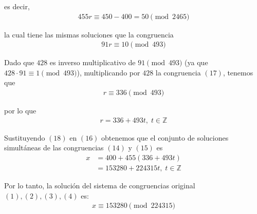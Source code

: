 \documentclass[letterpaper,10pt]{article}
\begin{document}
\begin{enumerate}
\begin{itemize}
        es decir,
        \begin{align*}
            455r \equiv 450-400 = 50 \pmod{2465}
        \end{align*}
        
        la cual tiene las mismas soluciones que la congruencia 
        \begin{align}
            91r \equiv 10 \pmod{493}
        \end{align}
        
        Dado que $428$ es inverso multiplicativo de $91 \pmod{493}$ (ya que
        $428 \cdot 91 \equiv 1 \pmod{493}$), multiplicando por $428$ la 
        congruencia $(17)$, tenemos que 
        \begin{align*}
            r \equiv 336 \pmod{493}
        \end{align*}
        
        por lo que 
        \begin{align}
            r = 336 + 493t, \; t \in \mathbb{Z}
        \end{align}
        
        Sustituyendo $(18)$ en $(16)$ obtenemos que el conjunto de soluciones
        simultáneas de las congruencias $(14)$ y $(15)$ es
        \begin{align*}
            x 
            &= 400 + 455(336 + 493t) \\
            &= 153280 + 224315t, \; t \in \mathbb{Z}
        \end{align*}
        
        Por lo tanto, la solución del sistema de congruencias original 
        $(1), (2), (3), (4)$ es:
        \begin{align*}
            x \equiv 153280 \pmod{224315}
        \end{align*}
    \end{itemize}
    

\end{enumerate}
\end{document}
